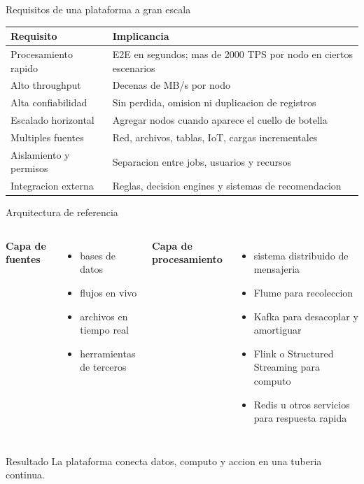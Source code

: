 \documentclass[aspectratio=169]{beamer}
\begin{document}
\begin{frame}{Requisitos de una plataforma a gran escala}
  \small
  \begin{tabularx}{\textwidth}{>{\RaggedRight\arraybackslash}X>{\RaggedRight\arraybackslash}X}
    \toprule
    \textbf{Requisito} & \textbf{Implicancia} \\
    \midrule
    Procesamiento rapido & E2E en segundos; mas de 2000 TPS por nodo en ciertos escenarios \\
    Alto throughput & Decenas de MB/s por nodo \\
    Alta confiabilidad & Sin perdida, omision ni duplicacion de registros \\
    Escalado horizontal & Agregar nodos cuando aparece el cuello de botella \\
    Multiples fuentes & Red, archivos, tablas, IoT, cargas incrementales \\
    Aislamiento y permisos & Separacion entre jobs, usuarios y recursos \\
    Integracion externa & Reglas, decision engines y sistemas de recomendacion \\
    \bottomrule
  \end{tabularx}
\end{frame}

\begin{frame}{Arquitectura de referencia}
  \begin{columns}[T]
      \textbf{Capa de fuentes}
      \begin{itemize}
        \item bases de datos
        \item flujos en vivo
        \item archivos en tiempo real
        \item herramientas de terceros
      \end{itemize}
      \textbf{Capa de procesamiento}
      \begin{itemize}
        \item sistema distribuido de mensajeria
        \item Flume para recoleccion
        \item Kafka para desacoplar y amortiguar
        \item Flink o Structured Streaming para computo
        \item Redis u otros servicios para respuesta rapida
      \end{itemize}
  \end{columns}
  \vspace{0.2cm}
  \begin{block}{Resultado}
    La plataforma conecta datos, computo y accion en una tuberia continua.
  \end{block}
\end{frame}
\end{document}
